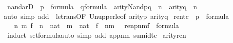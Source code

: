 \begin{isabellebody}
\isanewline
%
\endisadelimproof
{}\isamarkupfalse%
\ nand{\isacharunderscore}{\kern0pt}ar{}D\ {\isacharcolon}{\kern0pt}\ {\isachardoublequoteopen}p\ {\isasymin}\ formula\ {\isasymLongrightarrow}\ q{\isasymin}formula\ {\isasymLongrightarrow}\ arity{\isacharparenleft}{\kern0pt}Nand{\isacharparenleft}{\kern0pt}p{\isacharcomma}{\kern0pt}q{\isacharparenright}{\kern0pt}{\isacharparenright}{\kern0pt}\ {\isasymle}\ n\ {\isasymLongrightarrow}\ arity{\isacharparenleft}{\kern0pt}q{\isacharparenright}{\kern0pt}\ {\isasymle}\ n{\isachardoublequoteclose}\isanewline
%
\isadelimproof
\ \ %
\endisadelimproof
%
\isatagproof
{}\isamarkupfalse%
{\isacharparenleft}{\kern0pt}auto\ simp\ add{\isacharcolon}{\kern0pt}\ \ le{\isacharunderscore}{\kern0pt}trans{\isacharbrackleft}{\kern0pt}OF\ Un{\isacharunderscore}{\kern0pt}upper{}{\isacharunderscore}{\kern0pt}le{\isacharbrackleft}{\kern0pt}of\ {\isachardoublequoteopen}arity{\isacharparenleft}{\kern0pt}p{\isacharparenright}{\kern0pt}{\isachardoublequoteclose}\ {\isachardoublequoteopen}arity{\isacharparenleft}{\kern0pt}q{\isacharparenright}{\kern0pt}{\isachardoublequoteclose}{\isacharbrackright}{\kern0pt}{\isacharbrackright}{\kern0pt}{\isacharparenright}{\kern0pt}%
\endisatagproof
{\isafoldproof}%
%
\isadelimproof
\isanewline
%
\endisadelimproof
\isanewline
\isanewline
{}\isamarkupfalse%
\ ren{\isacharunderscore}{\kern0pt}tc\ {\isacharcolon}{\kern0pt}\ {\isachardoublequoteopen}p\ {\isasymin}\ formula\ {\isasymLongrightarrow}\isanewline
\ \ {\isacharparenleft}{\kern0pt}{\isasymAnd}\ n\ m\ f\ {\isachardot}{\kern0pt}\ n\ {\isasymin}\ nat\ {\isasymLongrightarrow}\ m\ {\isasymin}\ nat\ {\isasymLongrightarrow}\ f\ {\isasymin}\ n{\isasymrightarrow}m\ {\isasymLongrightarrow}\ \ ren{\isacharparenleft}{\kern0pt}p{\isacharparenright}{\kern0pt}{\isacharbackquote}{\kern0pt}n{\isacharbackquote}{\kern0pt}m{\isacharbackquote}{\kern0pt}f\ {\isasymin}\ formula{\isacharparenright}{\kern0pt}{\isachardoublequoteclose}\isanewline
%
\isadelimproof
\ \ %
\endisadelimproof
%
\isatagproof
{}\isamarkupfalse%
\ {\isacharparenleft}{\kern0pt}induct\ set{\isacharcolon}{\kern0pt}formula{\isacharcomma}{\kern0pt}auto\ simp\ add{\isacharcolon}{\kern0pt}\ app{\isacharunderscore}{\kern0pt}nm\ sum{\isacharunderscore}{\kern0pt}id{\isacharunderscore}{\kern0pt}tc{\isacharparenright}{\kern0pt}%
\endisatagproof
{\isafoldproof}%
%
\isadelimproof
\isanewline
%
\endisadelimproof
\isanewline
\isanewline
{}\isamarkupfalse%
\ arity{\isacharunderscore}{\kern0pt}ren\ {\isacharcolon}{\kern0pt}\isanewline

\end{isabellebody}
